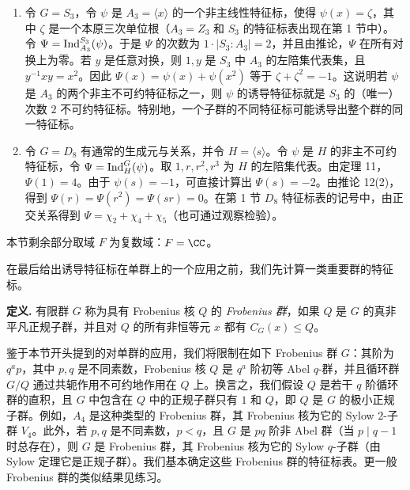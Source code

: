 \begin{enumerate}[label=(\arabic*)]
  \item 令 $G=S_3$，令 $\psi$ 是 $A_3=\langle x\rangle$ 的一个非主线性特征标，使得 $\psi(x)=\zeta$，其中 $\zeta$ 是一个本原三次单位根（$A_3=Z_3$ 和 $S_3$ 的特征标表出现在第 1 节中）。令 $\Psi=\operatorname{Ind}_{A_3}^{S_3}(\psi)$。于是 $\Psi$ 的次数为 $1\cdot |S_3:A_3|=2$，并且由推论，$\Psi$ 在所有对换上为零。若 $y$ 是任意对换，则 $1,y$ 是 $S_3$ 中 $A_3$ 的左陪集代表集，且 $y^{-1}xy=x^2$。因此 $\Psi(x)=\psi(x)+\psi(x^2)$ 等于 $\zeta+\zeta^2=-1$。这说明若 $\psi$ 是 $A_3$ 的两个非主不可约特征标之一，则 $\psi$ 的诱导特征标就是 $S_3$ 的（唯一）次数 $2$ 不可约特征标。特别地，一个子群的不同特征标可能诱导出整个群的同一特征标。

  \item 令 $G=D_8$ 有通常的生成元与关系，并令 $H=\langle s\rangle$。令 $\psi$ 是 $H$ 的非主不可约特征标，令 $\Psi=\operatorname{Ind}_H^G(\psi)$。取 $1,r,r^2,r^3$ 为 $H$ 的左陪集代表。由定理 11，$\Psi(1)=4$。由于 $\psi(s)=-1$，可直接计算出 $\Psi(s)=-2$。由推论 12(2)，得到 $\Psi(r)=\Psi(r^2)=\Psi(sr)=0$。在第 1 节 $D_8$ 特征标表的记号中，由正交关系得到 $\Psi=\chi_2+\chi_4+\chi_5$（也可通过观察检验）。
\end{enumerate}

本节剩余部分取域 $F$ 为复数域：$F=\CC$。

在最后给出诱导特征标在单群上的一个应用之前，我们先计算一类重要群的特征标。

\noindent\textbf{定义.} 有限群 $G$ 称为具有 Frobenius 核 $Q$ 的 \emph{Frobenius 群}，如果 $Q$ 是 $G$ 的真非平凡正规子群，并且对 $Q$ 的所有非恒等元 $x$ 都有 $C_G(x)\leq Q$。

鉴于本节开头提到的对单群的应用，我们将限制在如下 Frobenius 群 $G$：其阶为 $q^a p$，其中 $p,q$ 是不同素数，Frobenius 核 $Q$ 是 $q^a$ 阶初等 Abel $q$-群，并且循环群 $G/Q$ 通过共轭作用不可约地作用在 $Q$ 上。换言之，我们假设 $Q$ 是若干 $q$ 阶循环群的直积，且 $G$ 中包含在 $Q$ 中的正规子群只有 $1$ 和 $Q$，即 $Q$ 是 $G$ 的极小正规子群。例如，$A_4$ 是这种类型的 Frobenius 群，其 Frobenius 核为它的 Sylow $2$-子群 $V_4$。此外，若 $p,q$ 是不同素数，$p<q$，且 $G$ 是 $pq$ 阶非 Abel 群（当 $p\mid q-1$ 时总存在），则 $G$ 是 Frobenius 群，其 Frobenius 核为它的 Sylow $q$-子群（由 Sylow 定理它是正规子群）。我们基本确定这些 Frobenius 群的特征标表。更一般 Frobenius 群的类似结果见练习。

